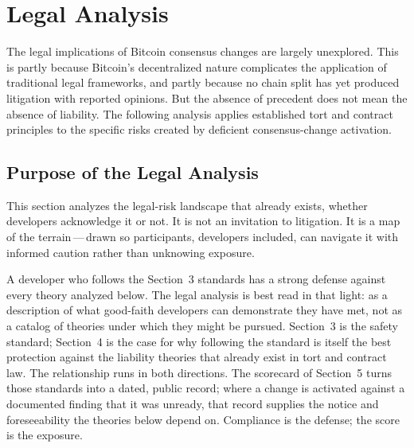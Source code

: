 \documentclass[11pt, twoside, openright]{book}
\begin{document}
\let\ccsrestorecdp\cleardoublepage
\let\cleardoublepage\clearpage
\chapter{Legal Analysis}
\let\cleardoublepage\ccsrestorecdp
\label{ch:legal}
\setcounter{section}{-1}  %

The legal implications of Bitcoin consensus changes are largely unexplored. This is partly because Bitcoin's decentralized nature complicates the application of traditional legal frameworks, and partly because no chain split has yet produced litigation with reported opinions. But the absence of precedent does not mean the absence of liability. The following analysis applies established tort and contract principles to the specific risks created by deficient consensus-change activation.

\section{Purpose of the Legal Analysis}

This section analyzes the legal-risk landscape that already exists, whether developers acknowledge it or not. It is not an invitation to litigation. It is a map of the terrain\,---\,drawn so participants, developers included, can navigate it with informed caution rather than unknowing exposure.

A developer who follows the Section~3 standards has a strong defense against every theory analyzed below. The legal analysis is best read in that light: as a description of what good-faith developers can demonstrate they have met, not as a catalog of theories under which they might be pursued. Section~3 is the safety standard; Section~4 is the case for why following the standard is itself the best protection against the liability theories that already exist in tort and contract law. The relationship runs in both directions. The scorecard of Section~5 turns those standards into a dated, public record; where a change is activated against a documented finding that it was unready, that record supplies the notice and foreseeability the theories below depend on. Compliance is the defense; the score is the exposure.
\end{document}
